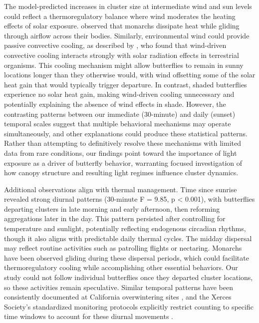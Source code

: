 The model-predicted increases in cluster size at intermediate wind and sun levels could reflect a thermoregulatory balance where wind moderates the heating effects of solar exposure. \textcite{mastersMonarchButterflyDanaus1988} observed that monarchs dissipate heat while gliding through airflow across their bodies. Similarly, environmental wind could provide passive convective cooling, as described by \textcite{riddellWindNicheThermal2025}, who found that wind-driven convective cooling interacts strongly with solar radiation effects in terrestrial organisms. This cooling mechanism might allow butterflies to remain in sunny locations longer than they otherwise would, with wind offsetting some of the solar heat gain that would typically trigger departure. In contrast, shaded butterflies experience no solar heat gain, making wind-driven cooling unnecessary and potentially explaining the absence of wind effects in shade. However, the contrasting patterns between our immediate (30-minute) and daily (sunset) temporal scales suggest that multiple behavioral mechanisms may operate simultaneously, and other explanations could produce these statistical patterns. Rather than attempting to definitively resolve these mechanisms with limited data from rare conditions, our findings point toward the importance of light exposure as a driver of butterfly behavior, warranting focused investigation of how canopy structure and resulting light regimes influence cluster dynamics.

Additional observations align with thermal management. Time since sunrise revealed strong diurnal patterns (30-minute F = 9.85, p < 0.001), with butterflies departing clusters in late morning and early afternoon, then reforming aggregations later in the day. This pattern persisted after controlling for temperature and sunlight, potentially reflecting endogenous circadian rhythms, though it also aligns with predictable daily thermal cycles. The midday dispersal may reflect routine activities such as patrolling flights or nectaring. Monarchs have been observed gliding during these dispersal periods, which could facilitate thermoregulatory cooling while accomplishing other essential behaviors. Our study could not follow individual butterflies once they departed cluster locations, so these activities remain speculative. Similar temporal patterns have been consistently documented at California overwintering sites \parencite{tuskesOverwinteringEcologyMonarch1978,chaplinEnergyReservesMetabolic1982}, and the Xerces Society's standardized monitoring protocols explicitly restrict counting to specific time windows to account for these diurnal movements \parencite{xercessocietyStepbyStepWesternMonarch2017}.

